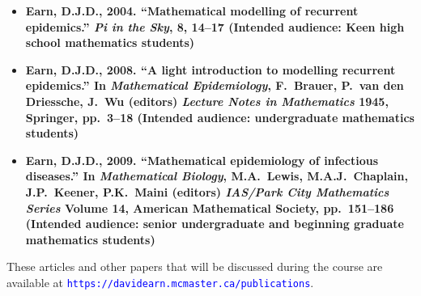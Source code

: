 \documentclass[12pt]{article}
\newcommand{\url}[1]{{\tt\textcolor{blue}{#1}}}
\begin{document}
\def\me{\bf Earn, D.J.D.\rm}
\def\vol#1{{\bf#1}}
\def\pp#1{{#1}}
\begin{itemize}

\item {}\me, 2004. ``Mathematical modelling of recurrent epidemics.'' 
{\it Pi in the Sky\/}, \vol{8}, 14--17\qquad
(Intended audience: Keen high school mathematics students)

\item{}\me, 2008. ``A light introduction to modelling recurrent epidemics.'' In {\it Mathematical Epidemiology\/}, F.\ Brauer, P.\ van den Driessche, J.\ Wu (editors) {\it Lecture Notes in Mathematics\/} \vol{1945}, Springer, pp.\ 3--18\qquad
(Intended audience: undergraduate mathematics students)

\item{}\me, 2009.  ``Mathematical epidemiology of infectious diseases.'' In {\it Mathematical Biology\/}, M.A.\ Lewis, M.A.J.\ Chaplain, J.P.\ Keener, P.K.\ Maini (editors) {\it IAS/Park City Mathematics Series\/} Volume {\bf 14}, American Mathematical Society, pp.\ 151--186\qquad
(Intended audience: senior undergraduate and beginning graduate mathematics students)

\end{itemize}

\noindent
These articles and other papers that will be discussed during the course are available at \url{https://davidearn.mcmaster.ca/publications}.

\end{document}
